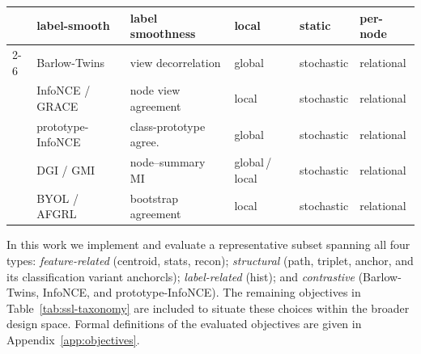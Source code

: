 \begin{table}[t]
\begin{tabular}{@{}llllll@{}}
  & label-smooth    & label smoothness         & local  & static     & per-node \\
\cmidrule(l){2-6}
\multirow{5}{*}{Contrastive}
  & Barlow-Twins      & view decorrelation     & global & stochastic & relational \\
  & InfoNCE / GRACE   & node view agreement    & local  & stochastic & relational \\
  & prototype-InfoNCE & class-prototype agree. & global & stochastic & relational \\
  & DGI / GMI         & node--summary MI       & global\,/\,local & stochastic & relational \\
  & BYOL / AFGRL      & bootstrap agreement    & local  & stochastic & relational \\
\bottomrule
\end{tabular}
\end{table}

In this work we implement and evaluate a representative subset spanning all four types: \emph{feature-related} (centroid, stats, recon); \emph{structural} (path, triplet, anchor, and its classification variant anchorcls); \emph{label-related} (hist); and \emph{contrastive} (Barlow-Twins, InfoNCE, and prototype-InfoNCE). The remaining objectives in Table~\ref{tab:ssl-taxonomy} are included to situate these choices within the broader design space. Formal definitions of the evaluated objectives are given in Appendix~\ref{app:objectives}.
